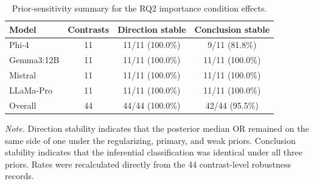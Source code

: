 \begin{table}[tbp]
\caption{Prior-sensitivity summary for the RQ2 importance condition effects.}
\label{tab:rq2_importance_prior_sensitivity_summary}
\begin{tabular}{lccc}
\toprule
Model & Contrasts & Direction stable & Conclusion stable \\
\midrule
Phi-4 & 11 & 11/11 (100.0\%) & 9/11 (81.8\%) \\
Gemma3:12B & 11 & 11/11 (100.0\%) & 11/11 (100.0\%) \\
Mistral & 11 & 11/11 (100.0\%) & 11/11 (100.0\%) \\
LLaMa-Pro & 11 & 11/11 (100.0\%) & 11/11 (100.0\%) \\
Overall & 44 & 44/44 (100.0\%) & 42/44 (95.5\%) \\
\bottomrule
\end{tabular}
\vspace{2pt}
\begin{minipage}{\linewidth}
\footnotesize\textit{Note.} Direction stability indicates that the posterior median OR remained on the same side of one under the regularizing, primary, and weak priors. Conclusion stability indicates that the inferential classification was identical under all three priors. Rates were recalculated directly from the 44 contrast-level robustness records.
\end{minipage}
\end{table}

